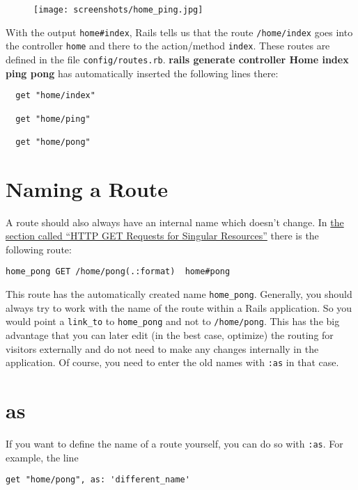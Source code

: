 \documentclass[a4paper]{book}
\newcommand{\chap}[1]{\newpage\thispagestyle{empty}\chapter{#1}\label{chap:\thechapter}}
\begin{document}
\begin{figure}[htbp]
\centering
\texttt{[image: screenshots/home\_ping.jpg]}
\end{figure}

With the output \texttt{home\#index}, Rails tells us that the route \texttt{/home/index} goes into the controller \texttt{home} and there to the action/method \texttt{index}. These routes are defined in the file \texttt{config/routes.rb}. \textbf{rails generate controller Home index ping pong} has automatically inserted the following lines there:

\begin{shaded}\begin{verbatim}
  get "home/index"

  get "home/ping"

  get "home/pong"
\end{verbatim}\end{shaded}

\chap{Naming a Route}\label{naming-a-route}

A route should also always have an internal name which doesn't change. In \hyperref[routesux5fget]{the section called “HTTP GET Requests for Singular Resources”} there is the following route:

\begin{shaded}\begin{verbatim}
home_pong GET /home/pong(.:format)  home#pong
\end{verbatim}\end{shaded}

This route has the automatically created name \texttt{home\_pong}. Generally, you should always try to work with the name of the route within a Rails application. So you would point a \texttt{link\_to} to \texttt{home\_pong} and not to \texttt{/home/pong}. This has the big advantage that you can later edit (in the best case, optimize) the routing for visitors externally and do not need to make any changes internally in the application. Of course, you need to enter the old names with \texttt{:as} in that case.

\chap{as}\label{as}

If you want to define the name of a route yourself, you can do so with \texttt{:as}. For example, the line

\begin{shaded}\begin{verbatim}
get "home/pong", as: 'different_name'
\end{verbatim}\end{shaded}
\end{document}
